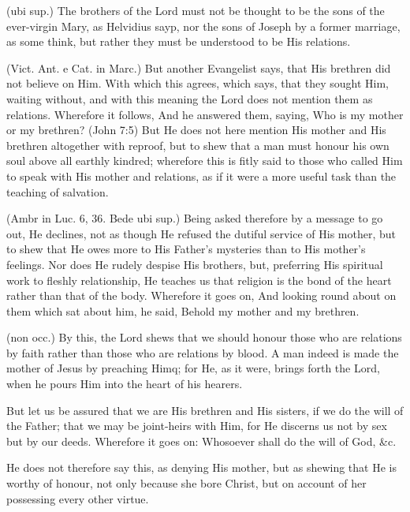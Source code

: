  (ubi sup.) The brothers of the Lord must not be thought to be the sons of the ever-virgin Mary, as Helvidius sayp, nor the sons of Joseph by a former marriage, as some think, but rather they must be understood to be His relations.

 (Vict. Ant. e Cat. in Marc.) But another Evangelist says, that His brethren did not believe on Him. With which this agrees, which says, that they sought Him, waiting without, and with this meaning the Lord does not mention them as relations. Wherefore it follows, And he answered them, saying, Who is my mother or my brethren? (John 7:5) But He does not here mention His mother and His brethren altogether with reproof, but to shew that a man must honour his own soul above all earthly kindred; wherefore this is fitly said to those who called Him to speak with His mother and relations, as if it were a more useful task than the teaching of salvation.

 (Ambr in Luc. 6, 36. Bede ubi sup.) Being asked therefore by a message to go out, He declines, not as though He refused the dutiful service of His mother, but to shew that He owes more to His Father’s mysteries than to His mother’s feelings. Nor does He rudely despise His brothers, but, preferring His spiritual work to fleshly relationship, He teaches us that religion is the bond of the heart rather than that of the body. Wherefore it goes on, And looking round about on them which sat about him, he said, Behold my mother and my brethren.

 (non occ.) By this, the Lord shews that we should honour those who are relations by faith rather than those who are relations by blood. A man indeed is made the mother of Jesus by preaching Himq; for He, as it were, brings forth the Lord, when he pours Him into the heart of his hearers.

 But let us be assured that we are His brethren and His sisters, if we do the will of the Father; that we may be joint-heirs with Him, for He discerns us not by sex but by our deeds. Wherefore it goes on: Whosoever shall do the will of God, \&c.

 He does not therefore say this, as denying His mother, but as shewing that He is worthy of honour, not only because she bore Christ, but on account of her possessing every other virtue.


